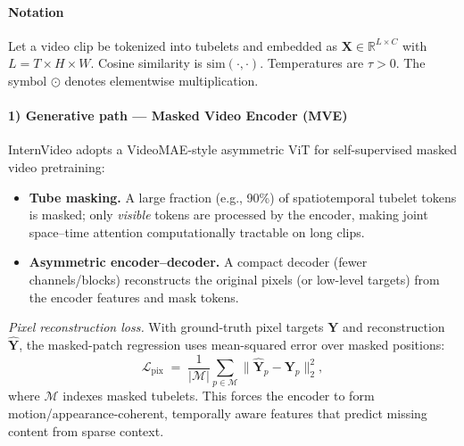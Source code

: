\begin{enrichment}
\begin{enrichment}
        \paragraph{Notation}
        Let a video clip be tokenized into tubelets and embedded as \(\bm{X}\!\in\!\mathbb{R}^{L\times C}\) with \(L=T\!\times\!H\!\times\!W\). Cosine similarity is \(\mathrm{sim}(\cdot,\cdot)\). Temperatures are \(\tau>0\). The symbol \(\odot\) denotes elementwise multiplication.
        
        \paragraph{1) Generative path --- Masked Video Encoder (MVE)}
        InternVideo adopts a VideoMAE-style asymmetric ViT for self-supervised masked video pretraining:
        \begin{itemize}
            \item \textbf{Tube masking.} A large fraction (e.g., 90\%) of spatiotemporal tubelet tokens is masked; only \emph{visible} tokens are processed by the encoder, making joint space–time attention computationally tractable on long clips.
            \item \textbf{Asymmetric encoder–decoder.} A compact decoder (fewer channels/blocks) reconstructs the original pixels (or low-level targets) from the encoder features and mask tokens. 
        \end{itemize}
        \emph{Pixel reconstruction loss.} With ground-truth pixel targets \(\bm{Y}\) and reconstruction \(\hat{\bm{Y}}\), the masked-patch regression uses mean-squared error over masked positions:
        \begin{equation}
            \mathcal{L}_{\text{pix}}
            \;=\;
            \frac{1}{|\mathcal{M}|}\sum_{p \in \mathcal{M}}\big\|\hat{\bm{Y}}_{p}-\bm{Y}_{p}\big\|_2^{2},
            \label{eq:internvideo_pix}
        \end{equation}
        where \(\mathcal{M}\) indexes masked tubelets. This forces the encoder to form motion/appearance-coherent, temporally aware features that predict missing content from sparse context.
        

\end{enrichment}
\end{enrichment}
